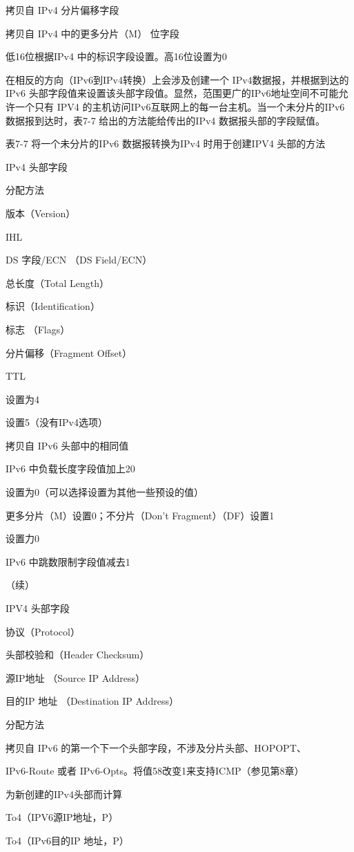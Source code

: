 拷贝自 IPv4 分片偏移字段

拷贝自 IPv4 中的更多分片（M） 位字段

低16位根据IPv4 中的标识字段设置。高16位设置为0

在相反的方向（IPv6到IPv4转换）上会涉及创建一个 IPv4数据报，并根据到达的IPv6
头部字段值来设置该头部字段值。显然，范围更广的IPv6地址空间不可能允许一个只有
IPV4 的主机访问IPv6互联网上的每一台主机。当一个未分片的IPv6 数据报到达时，表7-7
给出的方法能给传出的IPv4 数据报头部的字段赋值。

表7-7 将一个未分片的IPv6 数据报转换为IPv4 时用于创建IPV4 头部的方法

IPv4 头部字段

分配方法

版本（Version）

IHL

DS 字段/ECN （DS Field/ECN）

总长度（Total Length）

标识（Identification）

标志 （Flags）

分片偏移（Fragment Offset）

TTL

设置为4

设置5（没有IPv4选项）

拷贝自 IPv6 头部中的相同值

IPv6 中负载长度字段值加上20

设置为0（可以选择设置为其他一些预设的值）

更多分片（M）设置0；不分片（Don't Fragment）（DF）设置1

设置力0

IPv6 中跳数限制字段值减去1

（续）

IPV4 头部字段

协议（Protocol）

头部校验和（Header Checksum）

源IP地址 （Source IP Address）

目的IP 地址 （Destination IP Address）

分配方法

拷贝自 IPv6 的第一个下一个头部字段，不涉及分片头部、HOPOPT、

IPv6-Route 或者 IPv6-Opts。将值58改变1来支持ICMP（参见第8章）

为新创建的IPv4头部而计算

To4（IPV6源IP地址，P）

To4（IPv6目的IP 地址，P）


